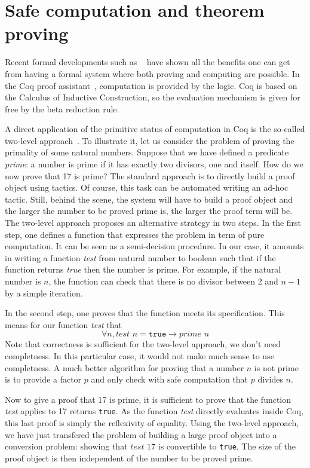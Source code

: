 

\section{Safe computation and theorem proving}

Recent formal developments such as ~\cite{4color,kepler} have shown all the benefits
one can get from having a formal system where both proving and computing are
possible. In the {\sc Coq} proof assistant~\cite{Coq}, computation is
provided by the logic. {\sc Coq} is based on the Calculus of 
Inductive Construction, so the evaluation mechanism is given for free
by the beta reduction rule. 

A direct application of the primitive status of computation in {\sc Coq} is 
the so-called two-level approach~\cite{boutin}. To illustrate it, 
let us consider the problem of proving the primality of some natural 
numbers.
Suppose that we have defined a predicate {\it prime}: a number is prime 
if it has exactly two divisors, one and itself. 
How do we now prove that 17 is prime? The standard approach is to
directly build a proof object using tactics. Of course, this task can be 
automated writing an ad-hoc tactic. Still, behind the scene, the system 
will have to build a proof object and the larger the number to be proved
prime is, the larger the proof term will be.
The two-level approach proposes an alternative
strategy in two steps. In the first step, one defines a function that expresses
the problem in term of pure computation. It can be seen as a semi-decision procedure.
In our case, it amounts in writing a 
function {\it test} from natural number to boolean such that if the function
returns {\it true} then the number is prime. 
For example, if the natural number
is $n$, the function can check that there is no divisor between 2 and $n-1$
by a simple iteration. 

In the second step, one proves that the function meets 
its specification. This means for our function {\it test} that
$$
\forall n, \textit{test}\,\, n = \texttt{true} \rightarrow \textit{prime}\,\, n
$$
Note that correctness is sufficient for the two-level approach, we don't need
completness. In this particular case, it would not make much sense to use completness.
A much better algorithm for proving that a number $n$ is not prime is to provide a factor
$p$ and only check with safe computation that $p$ divides $n$.

Now to give a proof that 17 is prime, it is sufficient to prove that the function
{\it test} applies to 17 returns {\tt true}. As the function {\it test} directly
evaluates inside {\sc Coq}, this last proof is simply the reflexivity of equality.
Using the two-level approach, we have just transfered the problem of building a 
large proof object into a conversion problem: showing that $\textit{test}\,\, 17$ is convertible
to {\tt true}.  The size of the proof object is then independent of the number to be proved
prime. 

